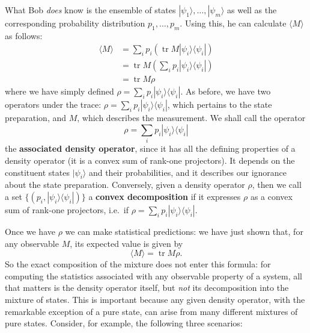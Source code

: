 \documentclass[fleqn,a4paper]{article}
\theoremstyle{definition}
\theoremstyle{definition}
\theoremstyle{definition}
\theoremstyle{definition}
\theoremstyle{remark}
\begin{document}
What Bob \emph{does} know is the ensemble of states \(|\psi_1\rangle,\ldots,|\psi_m\rangle\) as well as the corresponding probability distribution \(p_1,\ldots,p_m\).
Using this, he can calculate \(\langle M\rangle\) as follows:
\[
  \begin{aligned}
    \langle M\rangle
    &= \sum_i p_i\left( \operatorname{tr}M|\psi_i\rangle\langle\psi_i| \right)
  \\&= \operatorname{tr}M \left( \sum_i p_i|\psi_i\rangle\langle\psi_i| \right)
  \\&=\operatorname{tr}M\rho
  \end{aligned}
\]
where we have simply defined \(\rho=\sum_i p_i|\psi_i\rangle\langle\psi_i|\).
As before, we have two operators under the trace: \(\rho=\sum_i p_i|\psi_i\rangle\langle\psi_i|\), which pertains to the state preparation, and \(M\), which describes the measurement.
We shall call the operator
\[
  \rho = \sum_i p_i |\psi_i\rangle\langle\psi_i|
\]
the \textbf{associated density operator}, since it has all the defining properties of a density operator (it is a convex sum of rank-one projectors).
It depends on the constituent states \(|\psi_i\rangle\) and their probabilities, and it describes our ignorance about the state preparation.
Conversely, given a density operator \(\rho\), then we call a set \(\{(p_i,|\psi_i\rangle\langle\psi_i|)\}\) a \textbf{convex decomposition} if it expresses \(\rho\) as a convex sum of rank-one projectors, i.e.~if \(\rho=\sum_i p_i|\psi_i\rangle\langle\psi_i|\).

Once we have \(\rho\) we can make statistical predictions: we have just shown that, for any observable \(M\), its expected value is given by
\[
  \langle M\rangle = \operatorname{tr}M\rho.
\]
So the exact composition of the mixture does not enter this formula: for computing the statistics associated with any observable property of a system, all that matters is the density operator itself, but \emph{not} its decomposition into the mixture of states.
This is important because any given density operator, with the remarkable exception of a pure state, can arise from many different mixtures of pure states.
Consider, for example, the following three scenarios:
\end{document}

